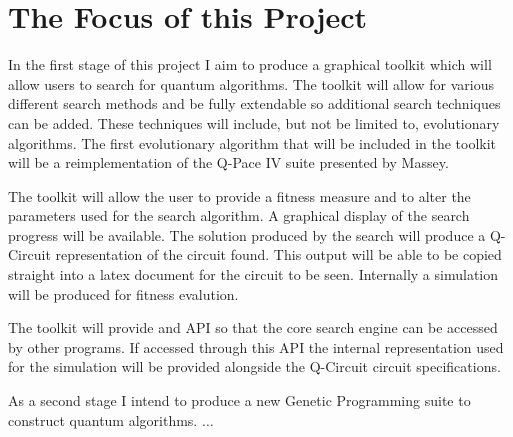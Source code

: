 \documentclass[authoryearcitations]{UoYCSproject}
\begin{document}
\section{The Focus of this Project}
In the first stage of this project I aim to produce a graphical toolkit which will allow users to search for quantum algorithms.
The toolkit will allow for various different search methods and be fully extendable so additional search techniques can be added.
These techniques will include, but not be limited to, evolutionary algorithms.
The first evolutionary algorithm that will be included in the toolkit will be a reimplementation of the Q-Pace IV suite presented by Massey\cite{masseythesis}.

The toolkit will allow the user to provide a fitness measure and to alter the parameters used for the search algorithm.
A graphical display of the search progress will be available.
The solution produced by the search will produce a Q-Circuit representation of the circuit found.
This output will be able to be copied straight into a latex document for the circuit to be seen.
Internally a simulation will be produced for fitness evalution.

The toolkit will provide and API so that the core search engine can be accessed by other programs.
If accessed through this API the internal representation used for the simulation will be provided alongside the Q-Circuit circuit specifications.

As a second stage I intend to produce a new Genetic Programming suite to construct quantum algorithms.
$\dots$



\end{document}
